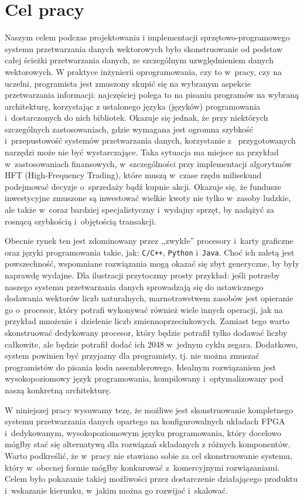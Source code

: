 \section{Cel pracy}
Naszym celem podczas projektowania i implementacji sprzętowo-programowego systemu przetwarzania danych wektorowych było skonstruowanie od podstaw całej ścieżki przetwarzania danych, ze szczególnym uzwględnieniem danych wektorowych. W praktyce inżynierii oprogramowania, czy to w~pracy, czy na uczelni, programista jest zmuszony skupić się na wybranym aspekcie przetwarzania informacji: najczęściej polega to na pisaniu programów na wybraną architekturę, korzystając z ustalonego języka (języków) programowania i~dostarczonych do nich bibliotek. Okazuje się jednak, że przy niektórych szczególnych zastosowaniach, gdzie wymagana jest ogromna szybkość i~przepustowość systemów przetwarzania danych, korzystanie z~ przygotowanych narzędzi może nie być wystarczające. Taka sytuacja ma miejsce na przykład w~zastosowaniach finansowych, w~szczególności przy implementacji algorytmów HFT (High-Frequency Trading), które muszą w~czase rzędu milisekund podejmować decyzje o~sprzedaży bądź kupnie akcji. Okazuje się, że fundusze inwestycyjne zmuszone są inwestować wielkie kwoty nie tylko w~zasoby ludzkie, ale także w~coraz bardziej specjalistyczny i~wydajny sprzęt, by nadążyć za rosnącą szybkością i~objętością transakcji.

Obecnie rynek ten jest zdominowany przez ,,zwykłe'' procesory i~karty graficzne oraz języki programowania takie, jak: {\tt C/C++}, {\tt Python} i~{\tt Java}. Choć ich zaletą jest powszechność, wspomniane rozwiązania mogą okazać się zbyt generyczne, by były naprawdę wydajne. Dla ilustracji przytoczmy prosty przykład: jeśli potrzeby naszego systemu przetwarzania danych sprowadzają się do ustawicznego dodawania wektorów liczb naturalnych, marnotrawstwem zasobów jest opieranie go o~procesor, który potrafi wykonywać również wiele innych operacji, jak na przykład mnożenie i~dzielenie liczb zmiennoprzecinkowych. Zamiast tego warto skonstruować dedykowany procesor, który będzie potrafił tylko dodawać liczby całkowite, ale będzie potrafił dodać ich 2048 w~jednym cyklu zegara. Dodatkowo, system powinien być przyjazny dla programisty, tj. nie można zmuszać programistów do pisania kodu assemblerowego. Idealnym rozwiązaniem jest wysokopoziomowy język programowania, kompilowany i~optymalizowany pod naszą konkretną architekturę.

W niniejszej pracy wysuwamy tezę, że możliwe jest skonstruowanie kompletnego systemu przetwarzania danych opartego na konfigurowalnych układach FPGA i~dedykowanym, wysokopoziomowym języku programowania, który docelowo mógłby stać się alternatywą dla rozwiązań składanych z różnych komponentów. Warto podkreślić, że w~pracy nie stawiano sobie za cel skonstruowanie systemu, który w~obecnej formie mógłby konkurować z~komercyjnymi rozwiązaniami. Celem było pokazanie takiej możliwości przez dostarczenie działającego produktu i~wskazanie kierunku, w~jakim można go rozwijać i~skalować.


